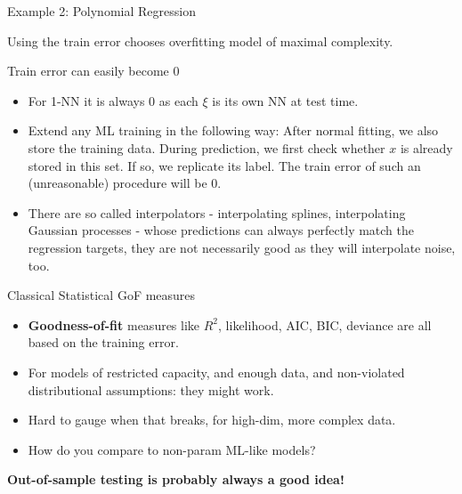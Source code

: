 \begin{vbframe}{Example 2: Polynomial Regression}
\vfill

Using the train error chooses overfitting model of maximal complexity.

\end{vbframe}



\begin{vbframe}{Train error can easily become 0}


\begin{itemize}
    \item For 1-NN it is always 0 as each $\xi$ is its own NN at test time.
  \item Extend any ML training in the following way:
    After normal fitting, we also store the training data.
    During prediction, we first check whether $x$ is already stored in this set. 
    If so, we replicate its label.
    The train error of such an (unreasonable) procedure will be 0.
  \item There are so called interpolators - interpolating 
  splines, interpolating Gaussian processes - whose predictions can always 
  perfectly match the regression targets, they are not necessarily good as they 
  will interpolate noise, too.
\end{itemize}
\end{vbframe}


\begin{vbframe}{Classical Statistical GoF measures}

\begin{itemize}
  \item \textbf{Goodness-of-fit} measures like $R^2$, likelihood, AIC, 
  BIC, deviance are all based on the training error.
  \item For models of restricted capacity, and enough data, 
      and non-violated distributional assumptions: 
      they might work.
  \item Hard to gauge when that breaks, for high-dim, more complex data.
  \item How do you compare to non-param ML-like models?
\end{itemize}

\vfill

\textbf{Out-of-sample testing is probably always a good idea!}

\end{vbframe}




\endlecture

